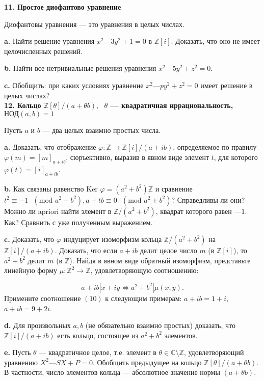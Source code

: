 \noindent \textbf{11. Простое диофантово уравнение}

Диофантовы уравнения — это уравнения в целых числах.

\textbf{a.} Найти решение уравнения $x^2 — 3 y^2 + 1 = 0$ в $\mathbb{Z}[i]$. Доказать, что оно не имеет целочисленных решений.

\textbf{b.} Найти все нетривиальные решения уравнения $x^2 — 5 y^2 + z^2 = 0$.

\textbf{c.} Обобщить: при каких условиях уравнение $x^2 —py^2 + z^2 = 0$ имеет решение в целых числах?
\\

\noindent \textbf{12. Кольцо $\mathbb{Z}[\theta] / (a + \theta b), \text{ } \theta$ — квадратичная иррациональность,} \\ $\text{НОД}(a,b) = 1$

Пусть $a$ и $b$ — два целых взаимно простых числа.

\textbf{a.} Доказать, что отображение $\varphi:\mathbb{Z}\to\mathbb{Z}[i]/(a+ib)$, определяемое по правилу $\varphi(m)=[m]_{a+ib}$, сюръективно, выразив в явном виде элемент $t$, для которого $\varphi(t)=[i]_{a+ib}$.

\textbf{b.} Как связаны равенство $\text{Ker }\varphi=(a^2+b^2)\mathbb{Z}$ и сравнение $t^2\equiv-1 \text{ } (\text{mod } a^2+b^2), a+tb\equiv0 \text{ } (\text{mod } a^2+b^2)$? Справедливы ли они? Можно ли
apriori найти элемент в $\mathbb{Z}/(a^2 + b^2)$, квадрат которого равен $—1$. Как? Сравнить с уже полученным выражением.

\textbf{c.} Доказать, что $\varphi$ индуцирует изоморфизм кольца $\mathbb{Z}/(a^2 + b^2)$ на $\mathbb{Z}[i]/(a+ib)$. Доказать, что если $a + ib$ делит целое число $m$ (в $\mathbb{Z}[i]$), то $a^2 + b^2$ делит $m$ (в $\mathbb{Z}$). Найдя в явном виде обратный изоморфизм, представьте линейную форму $\mu:\mathbb{Z}^2\to\mathbb{Z}$, удовлетворяющую соотношению:

\[
a+ib|x+iy\Longleftrightarrow a^2+b^2|\mu(x,y).
\]
Примените соотношение $(10)$ к следующим примерам: $a + ib = 1 + i$,
$a + ib = 9 + 2i$.

\textbf{d.} Для произвольных $a, b$ (не обязательно взаимно простых) 
доказать, что $\mathbb{Z}[i]/(a+ib)$ есть кольцо, состоящее из $a^2 + b^2$ элементов.

\textbf{e.} Пусть $\theta$ — квадратичное целое, т.е. элемент в $\theta \in \mathbb{C}\setminus\mathbb{Z}$, удовлетворяющий уравнению $X^2 — SX + P = 0$. Обобщить предыдущее на кольцо $\mathbb{Z}[\theta] / (a + \theta b)$. В частности, число элементов кольца — абсолютное значение нормы $(a + \theta b)$.

